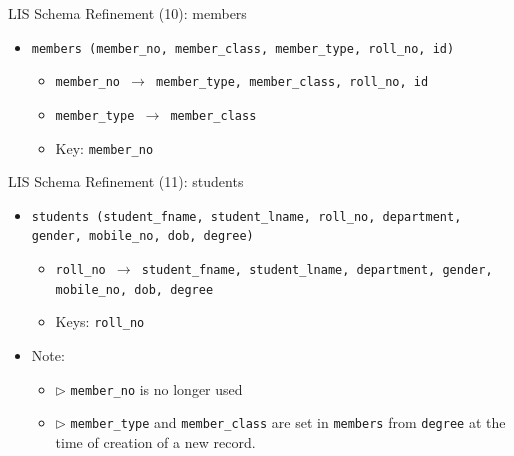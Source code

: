 \documentclass[aspectratio=169, xcolor=dvipsnames]{beamer}
\begin{document}
\begin{frame}{LIS Schema Refinement (10): members}
    \begin{itemize}
        \item \texttt{members (member\_no, member\_class, member\_type, roll\_no, id)}
        \begin{itemize}
            \item \texttt{member\_no $\rightarrow$ member\_type, member\_class, roll\_no, id}
            \item \texttt{member\_type $\rightarrow$ member\_class}
            \item Key: \texttt{member\_no}
        \end{itemize}
    \end{itemize}
\end{frame}

\begin{frame}{LIS Schema Refinement (11): students}
    \begin{itemize}
        \item \texttt{students (student\_fname, student\_lname, roll\_no, department, gender, mobile\_no, dob, degree)}
        \begin{itemize}
            \item \texttt{roll\_no $\rightarrow$ student\_fname, student\_lname, department, gender, mobile\_no, dob, degree}
            \item Keys: \texttt{roll\_no}
        \end{itemize}
        \item Note:
        \begin{itemize}
            \item $\triangleright$ \texttt{member\_no} is no longer used
            \item $\triangleright$ \texttt{member\_type} and \texttt{member\_class} are set in \texttt{members} from \texttt{degree} at the time of creation of a new record.
        \end{itemize}
    \end{itemize}
\end{frame}
\end{document}
